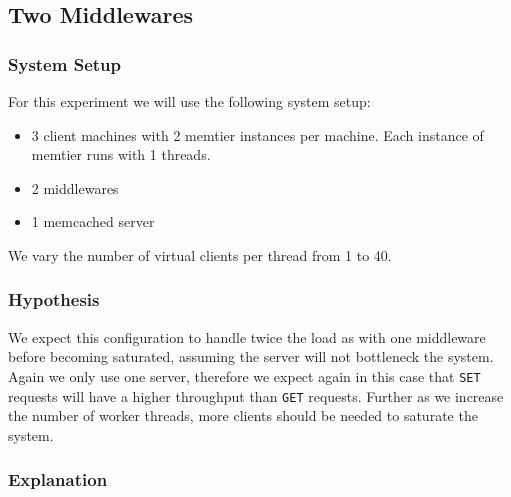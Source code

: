 \documentclass[11pt,a4paper]{article}
\begin{document}
\subsection{Two Middlewares}
%
\subsubsection{System Setup}
%
For this experiment we will use the following system setup:
%
\begin{itemize}
	\item 3 client machines with 2 memtier instances per machine. Each instance of memtier runs with 1 threads.
	\item 2 middlewares
	\item 1 memcached server
\end{itemize}
%
We vary the number of virtual clients per thread from 1 to 40.
%
\subsubsection{Hypothesis}
%
We expect this configuration to handle twice the load as with one middleware before becoming saturated, assuming the server will not bottleneck the system.
%
Again we only use one server, therefore we expect again in this case that \texttt{SET} requests will have a higher throughput than \texttt{GET} requests.
%
Further as we increase the number of worker threads, more clients should be needed to saturate the system.
%
\subsubsection{Explanation}\label{subsec:two_middlewares_explanation}
%
\end{document}

